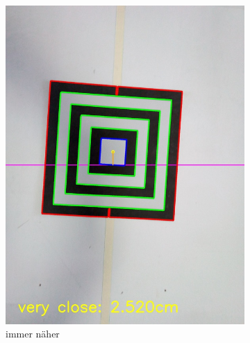 \begin{figure}
\begin{subfigure}{0.3\textwidth}
        \includegraphics[width=0.95\linewidth]{pics/zielfeld/07.jpg}
        \caption{immer näher}
        \label{fig:zielfeld7}
    \end{subfigure}
    \begin{subfigure}{0.3\textwidth}
        \centering

\end{subfigure}
\end{figure}
